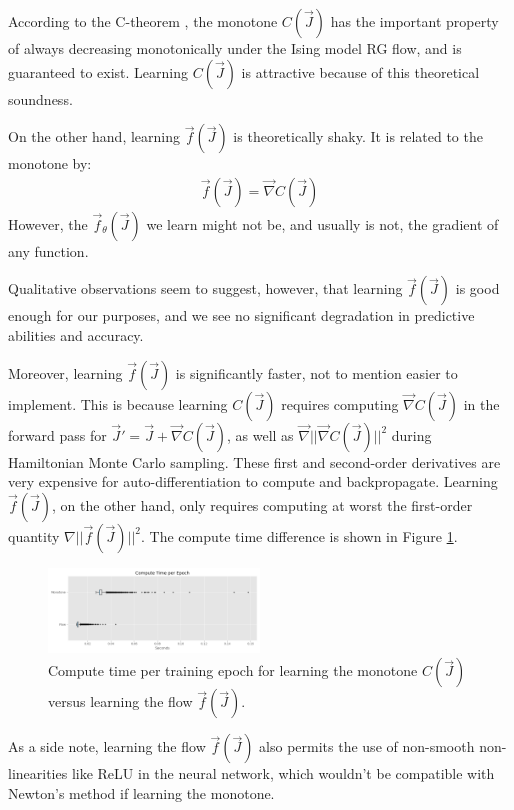 \documentclass[%
    reprint,
    amsmath,amssymb,
    aps,
]{revtex4-2}
\begin{document}
According to the C-theorem \cite{c-theorem}, the monotone $C(\vec{J})$ has the important property of always decreasing monotonically under the Ising model RG flow, and is guaranteed to exist. 
Learning $C(\vec{J})$ is attractive because of this theoretical soundness. 

On the other hand, learning $\vec{f}(\vec{J})$ is theoretically shaky. 
It is related to the monotone by:
\begin{eqnarray}
    \vec{f}(\vec{J}) = \vec{\nabla} C(\vec{J})
\end{eqnarray}
However, the $\vec{f}_\theta(\vec{J})$ we learn might not be, and usually is not, the gradient of any function. 

Qualitative observations seem to suggest, however, that learning $\vec{f}(\vec{J})$ is good enough for our purposes, and we see no significant degradation in predictive abilities and accuracy. 

Moreover, learning $\vec{f}(\vec{J})$ is significantly faster, not to mention easier to implement. 
This is because learning $C(\vec{J})$ requires computing $\vec{\nabla} C(\vec{J})$ in the forward pass for $\vec{J}' = \vec{J} + \vec{\nabla} C(\vec{J})$, as well as $\vec{\nabla} ||\vec{\nabla} C(\vec{J})||^2$ during Hamiltonian Monte Carlo sampling. 
These first and second-order derivatives are very expensive for auto-differentiation to compute and backpropagate. 
Learning $\vec{f}(\vec{J})$, on the other hand, only requires computing at worst the first-order quantity $\nabla || \vec{f}(\vec{J}) ||^2$. 
The compute time difference is shown in Figure \ref{fig:flow-monotone}. 
\begin{figure}[h]
    \includegraphics[width=0.5\textwidth]{tex/images/a1-silu-flow-monotone-times.png}
    \caption{\label{fig:flow-monotone}
        Compute time per training epoch for learning the monotone $C(\vec{J})$ versus learning the flow $\vec{f}(\vec{J})$. 
    }
\end{figure}

As a side note, learning the flow $\vec{f}(\vec{J})$ also permits the use of non-smooth non-linearities like ReLU in the neural network, which wouldn't be compatible with Newton's method if learning the monotone. 
\end{document}
